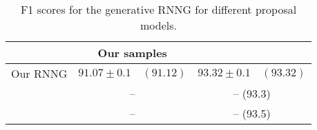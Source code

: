 

\begin{table}[h]
\center
  \begin{tabular}{l|c|c}
        & Our samples & \citet{dyer2016rnng} \\ \hline
      Our RNNG  & $91.07 \pm	0.1 \quad (91.12)$ & $93.32 \pm 0.1 \quad (93.32)$  \\
      \citet{dyer2016rnng}  & -- & -- \quad (93.3) \\
      \citet{kuncoro2017syntax} & -- & -- \quad (93.5)
  \end{tabular}
  \caption{F1 scores for the generative RNNG for different proposal models.}
  \label{tab:gen-fscores}
\end{table}
